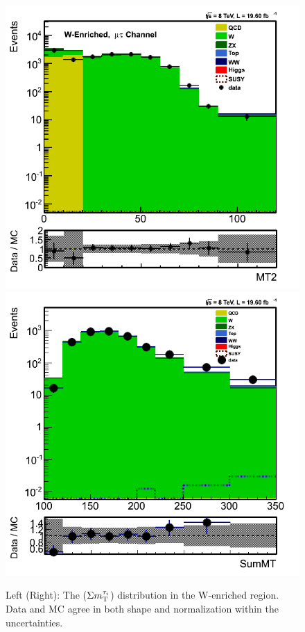 \begin{figure}[!Hhtb]
\centering
\includegraphics[angle=0,scale=0.35]{TauTauFigs/MT2_WValidation.png}
\includegraphics[angle=0,scale=0.35]{TauTauFigs/summt_WValidationBinII_reBinned.png}\\
\caption{Left (Right): The \mttwo ($\Sigma m_{\rm T}^{\tau_i}$) distribution in the W-enriched region. Data and MC agree in both shape and normalization within the uncertainties.}
\label{fig:WValidation}
\end{figure}
